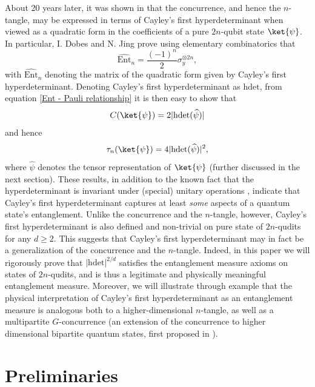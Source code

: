 \documentclass{article}
\begin{document}
About 20 years later, it was shown in \cite{dobes2024qubits} that the concurrence, and hence the $n$-tangle, may be expressed in terms of Cayley's first hyperdeterminant when viewed as a quadratic form in the coefficients of a pure $2n$-qubit state $\ket{\psi}$. In particular, I. Dobes and N. Jing prove using elementary combinatorics that 
\begin{equation}\label{Ent - Pauli relationship}
    \widehat{\mathrm{Ent}}_n = \frac{(-1)^n}{2}\sigma_y^{\otimes 2n},
\end{equation}
with $\widehat{\mathrm{Ent}}_n$ denoting the matrix of the quadratic form given by Cayley's first hyperdeterminant. Denoting Cayley's first hyperdeterminant as $\mathrm{hdet}$, from equation \eqref{Ent - Pauli relationship} it is then easy to show that 
\[C(\ket{\psi}) = 2|\mathrm{hdet}(\widehat{\psi})|\]
and hence
\[\tau_n(\ket{\psi}) = 4|\mathrm{hdet}(\widehat{\psi})|^2,\]
where $\widehat{\psi}$ denotes the tensor representation of $\ket{\psi}$ (further discussed in the next section). These results, in addition to the known fact that the hyperdeterminant is invariant under (special) unitary operations \cite{jing2014slocc}, indicate that Cayley's first hyperdeterminant captures at least \textit{some} aspects of a quantum state's entanglement. Unlike the concurrence and the $n$-tangle, however, Cayley's first hyperdeterminant is also defined and non-trivial on pure state of $2n$-qudits for any $d\geq 2$. This suggests that Cayley's first hyperdeterminant may in fact be a generalization of the concurrence and the $n$-tangle. Indeed, in this paper we will rigorously prove that $|\mathrm{hdet}|^{2/d}$ satisfies the entanglement measure axioms on states of $2n$-qudits, and is thus a legitimate and physically meaningful entanglement measure. Moreover, we will illustrate through example that the physical interpretation of Cayley's first hyperdeterminant as an entanglement measure is analogous both to a higher-dimensional $n$-tangle, as well as a multipartite $G$-concurrence (an extension of the concurrence to higher dimensional bipartite quantum states, first proposed in \cite{gour2005mixed}). 

\section{Preliminaries}
\end{document}
